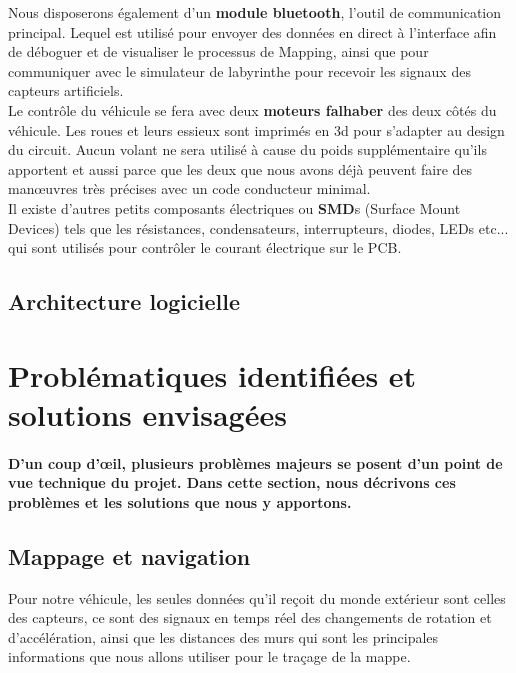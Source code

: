    Nous disposerons également d'un \textbf{module bluetooth}, l'outil de
communication principal.  Lequel est utilisé pour envoyer des données en
direct à l'interface afin de déboguer et de visualiser le processus de
Mapping, ainsi que pour communiquer avec le simulateur de labyrinthe pour
recevoir les signaux des capteurs artificiels. \\


   Le contrôle du véhicule se fera avec deux \textbf{moteurs falhaber}
\cite{faulhaber:1} des deux côtés du véhicule. Les roues et leurs essieux sont
imprimés en 3d pour s'adapter au design du circuit. Aucun volant ne sera
utilisé à cause du poids supplémentaire qu'ils apportent et aussi parce que
les deux que nous avons déjà peuvent faire des manœuvres très précises avec un
code conducteur minimal. \\


   Il existe d'autres petits composants électriques ou \textbf{SMD}s (Surface
Mount Devices) tels que les résistances, condensateurs, interrupteurs,
diodes, LEDs etc... qui sont utilisés pour contrôler le courant électrique
sur le PCB.

\subsection{Architecture logicielle} \label{subsec:vueLogicielle}



\section{Problématiques identifiées et solutions envisagées} \label{sec:problemesSolutions}

\paragraph{
   D'un coup d'œil, plusieurs problèmes majeurs se posent d'un point de vue
technique du projet.  Dans cette section, nous décrivons ces problèmes et
les solutions que nous y apportons.}



\subsection{Mappage et navigation} \label{subsec:rechChem} 

   Pour notre véhicule, les seules données qu'il reçoit du monde extérieur sont
celles des capteurs, ce sont des signaux en temps réel des changements de
rotation et d'accélération, ainsi que les distances des murs qui sont les
principales informations que nous allons utiliser pour le traçage de la mappe. \\

